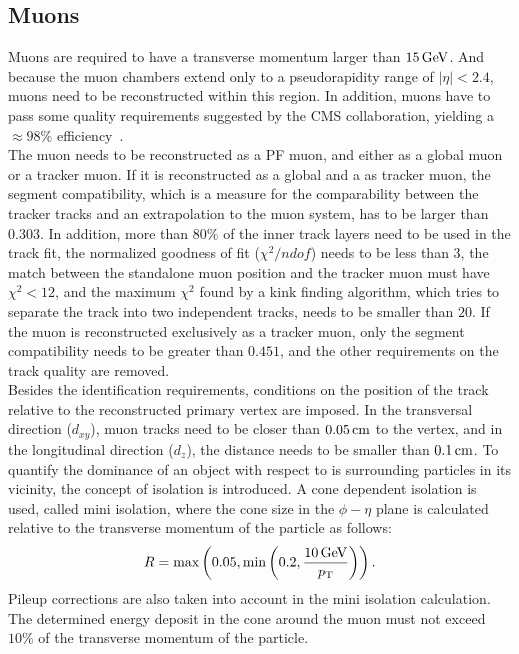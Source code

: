 \subsection{Muons}
Muons are required to have a transverse momentum larger than $15\,\text{Ge\hspace{-.08em}V}$. And because the muon chambers extend only to a pseudorapidity range of $|\eta|<2.4$, muons need to be reconstructed within this region. In addition, muons have to pass some quality requirements suggested by the CMS collaboration, yielding a $\approx 98\%$ efficiency~\cite{MuonIDPerf}.\\
The muon needs to be reconstructed as a PF muon, and either as a global muon or a tracker muon. If it is reconstructed as a global and a as tracker muon, the segment compatibility, which is a measure for the comparability between the tracker tracks and an extrapolation to the muon system, has to be larger than $0.303$. In addition, more than $80\%$ of the inner track layers need to be used in the track fit, the normalized goodness of fit ($\chi^2/ndof$) needs to be less than $3$, the match between the standalone muon position and the tracker muon must have $\chi^2<12$, and the maximum $\chi^2$ found by a kink finding algorithm, which tries to separate the track into two independent tracks, needs to be smaller than $20$. If the muon is reconstructed exclusively as a tracker muon, only the segment compatibility needs to be greater than $0.451$, and the other requirements on the track quality are removed.\\
Besides the identification requirements, conditions on the position of the track relative to the reconstructed primary vertex are imposed. In the transversal direction ($d_{xy}$), muon tracks need to be closer than $0.05\,\text{cm}$ to the vertex, and in the longitudinal direction ($d_z$), the distance needs to be smaller than $0.1\,\text{cm}$. To quantify the dominance of an object with respect to is surrounding particles in its vicinity, the concept of isolation is introduced. A cone dependent isolation is used, called mini isolation, where the cone size in the $\phi-\eta$ plane is calculated relative to the transverse momentum of the particle as follows:
\begin{equation}
 R = \text{max}\left(0.05,\text{min}\left(0.2,\frac{10\,\text{Ge\hspace{-.08em}V}}{p_{\mathrm{T}}}\right)\right).
\end{equation}
Pileup corrections are also taken into account in the mini isolation calculation.
The determined energy deposit in the cone around the muon must not exceed $10\%$ of the transverse momentum of the particle.


